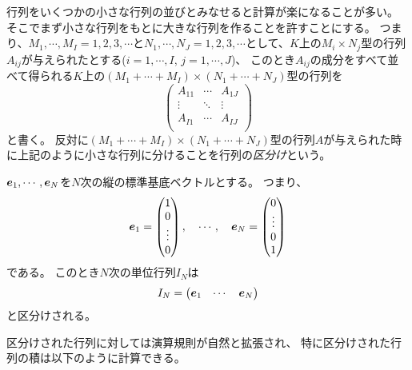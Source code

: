 行列をいくつかの小さな行列の並びとみなせると計算が楽になることが多い。
そこでまず小さな行列をもとに大きな行列を作ることを許すことにする。
つまり、$M_1, \cdots, M_I = 1, 2, 3, \cdots$と$N_1, \cdots, N_J = 1, 2, 3, \cdots$として、$K$上の$M_i\times N_j$型の行列$A_{i j}$が与えられたとする($i = 1, \cdots, I$, $j = 1, \cdots, J$)、
このとき$A_{i j}$の成分をすべて並べて得られる$K$上の$(M_1+\cdots+M_I)\times(N_1+\cdots+N_J)$型の行列を
$$
\begin{pmatrix}
A_{1 1} & \cdots & A_{1 J} \\
\vdots & \ddots & \vdots \\
A_{I 1} & \cdots & A_{I J} \\
\end{pmatrix}
$$
と書く。
反対に$(M_1+\cdots+M_I)\times(N_1+\cdots+N_J)$型の行列$A$が与えられた時に上記のように小さな行列に分けることを行列の\emph{区分け}という。

\begin{example}
$\vb*{e}_1, \cdots, \vb*{e}_N$を$N$次の縦の標準基底ベクトルとする。
つまり、
$$
\vb*{e}_1 = \begin{pmatrix}1 \\ 0 \\ \vdots \\ 0\end{pmatrix},
\quad \cdots,
\quad \vb*{e}_N = \begin{pmatrix}0 \\ \vdots \\ 0 \\ 1\end{pmatrix}
$$
である。
このとき$N$次の単位行列$I_N$は
$$
I_N = \begin{pmatrix}\vb*{e}_1 & \cdots & \vb*{e}_N\end{pmatrix}
$$
と区分けされる。
\end{example}

区分けされた行列に対しては演算規則が自然と拡張され、
特に区分けされた行列の積は以下のように計算できる。

